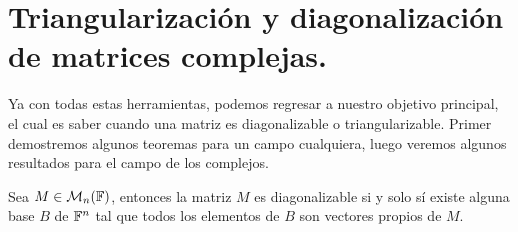 \section{Triangularización y diagonalización de matrices complejas.}

Ya con todas estas herramientas, podemos regresar a nuestro objetivo principal, el cual es saber cuando una matriz es diagonalizable o triangularizable. Primer demostremos algunos teoremas para un campo cualquiera, luego veremos algunos resultados para el campo de los complejos.

\begin{teor}
  Sea $M \in \mathcal{M}_n(\mathbb{F})$, entonces la matriz $M$ es diagonalizable si y solo sí existe alguna base $B$ de $\mathbb{F}^n$ tal que todos los elementos de $B$ son vectores propios de $M$.
\end{teor}
